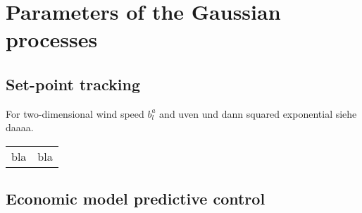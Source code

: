 \chapter{Parameters of the Gaussian processes}
\label{cha:param_gaussian_processes}

\section{Set-point tracking}
\label{sec:gp_param_sp}

For two-dimensional wind speed $b_l^a$ and uven und dann squared exponential siehe daaaa.
\begin{table}[h]
	\centering
		\begin{tabular}{c|c}\hline
		bla & bla 
		\end{tabular}
\end{table}

\section{Economic model predictive control}
\label{sec:gp_param_empc}


